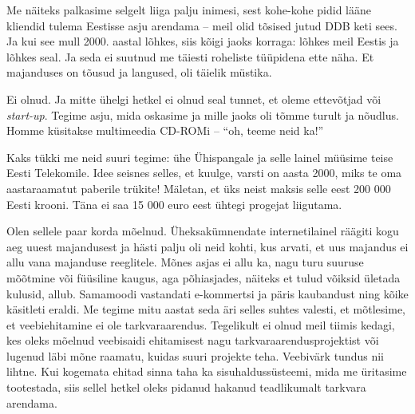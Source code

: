 Me näiteks palkasime selgelt liiga palju inimesi, 
sest kohe-kohe pidid lääne kliendid tulema Eestisse asju arendama -- meil olid 
tõsised jutud DDB keti sees. Ja kui see mull 2000. aastal 
lõhkes, siis 
kõigi jaoks korraga: lõhkes meil Eestis ja lõhkes seal. Ja seda ei suutnud
me täiesti roheliste tüüpidena ette näha. Et majanduses on 
tõusud ja langused, oli täielik müstika. 


Ei olnud. Ja mitte ühelgi hetkel ei olnud seal tunnet, et oleme 
ettevõtjad või \emph{start-up}. Tegime asju, mida oskasime ja 
mille jaoks oli tõmme turult ja nõudlus. Homme 
küsitakse multimeedia CD-ROMi -- \enquote{oh, teeme neid ka!} 


Kaks tükki me neid suuri tegime: ühe Ühispangale 
ja selle lainel müüsime teise Eesti Telekomile. 
Idee seisnes selles, et kuulge, varsti on aasta 2000, miks te oma 
aastaraamatut paberile trükite! Mäletan, et üks neist 
maksis selle eest 200 000 Eesti krooni. Täna ei saa 15 
000 euro eest ühtegi progejat liigutama.


Olen sellele paar korda mõelnud. Üheksakümnendate internetilainel räägiti kogu aeg uuest majandusest ja hästi palju oli neid kohti, 
kus arvati, et uus majandus ei allu vana majanduse reeglitele. Mõnes asjas ei 
allu ka, nagu turu suuruse mõõtmine või füüsiline kaugus, aga põhiasjades, näiteks et tulud võiksid ületada kulusid, allub. Samamoodi 
vastandati e-kommertsi ja päris kaubandust ning kõike käsitleti 
eraldi. Me tegime mitu aastat seda äri selles suhtes 
valesti, et mõtlesime, et veebiehitamine ei ole tarkvaraarendus. 
Tegelikult ei olnud meil tiimis kedagi, kes oleks mõelnud veebisaidi 
ehitamisest nagu tarkvaraarendusprojektist või lugenud läbi mõne raamatu, kuidas suuri projekte teha. Veebivärk tundus 
nii lihtne. Kui kogemata ehitad sinna taha ka sisuhaldussüsteemi, 
mida me üritasime tootestada, siis sellel hetkel oleks pidanud hakanud teadlikumalt tarkvara arendama. 

